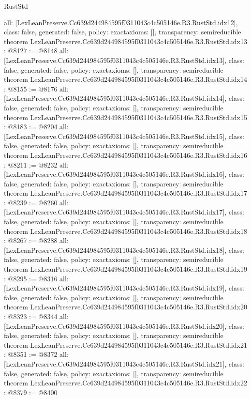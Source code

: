 \begin{lexlean}{RustStd}
\begin{coremodule}
{  all: [LexLeanPreserve.Cc639d244984595f0311043c4c505146e.R3.RustStd.idx12],
  class: false,
  generated: false,
  policy: exact{axioms: []},
  transparency: semireducible
}
theorem LexLeanPreserve.Cc639d244984595f0311043c4c505146e.R3.RustStd.idx13 : @8127 := @8148 {
  all: [LexLeanPreserve.Cc639d244984595f0311043c4c505146e.R3.RustStd.idx13],
  class: false,
  generated: false,
  policy: exact{axioms: []},
  transparency: semireducible
}
theorem LexLeanPreserve.Cc639d244984595f0311043c4c505146e.R3.RustStd.idx14 : @8155 := @8176 {
  all: [LexLeanPreserve.Cc639d244984595f0311043c4c505146e.R3.RustStd.idx14],
  class: false,
  generated: false,
  policy: exact{axioms: []},
  transparency: semireducible
}
theorem LexLeanPreserve.Cc639d244984595f0311043c4c505146e.R3.RustStd.idx15 : @8183 := @8204 {
  all: [LexLeanPreserve.Cc639d244984595f0311043c4c505146e.R3.RustStd.idx15],
  class: false,
  generated: false,
  policy: exact{axioms: []},
  transparency: semireducible
}
theorem LexLeanPreserve.Cc639d244984595f0311043c4c505146e.R3.RustStd.idx16 : @8211 := @8232 {
  all: [LexLeanPreserve.Cc639d244984595f0311043c4c505146e.R3.RustStd.idx16],
  class: false,
  generated: false,
  policy: exact{axioms: []},
  transparency: semireducible
}
theorem LexLeanPreserve.Cc639d244984595f0311043c4c505146e.R3.RustStd.idx17 : @8239 := @8260 {
  all: [LexLeanPreserve.Cc639d244984595f0311043c4c505146e.R3.RustStd.idx17],
  class: false,
  generated: false,
  policy: exact{axioms: []},
  transparency: semireducible
}
theorem LexLeanPreserve.Cc639d244984595f0311043c4c505146e.R3.RustStd.idx18 : @8267 := @8288 {
  all: [LexLeanPreserve.Cc639d244984595f0311043c4c505146e.R3.RustStd.idx18],
  class: false,
  generated: false,
  policy: exact{axioms: []},
  transparency: semireducible
}
theorem LexLeanPreserve.Cc639d244984595f0311043c4c505146e.R3.RustStd.idx19 : @8295 := @8316 {
  all: [LexLeanPreserve.Cc639d244984595f0311043c4c505146e.R3.RustStd.idx19],
  class: false,
  generated: false,
  policy: exact{axioms: []},
  transparency: semireducible
}
theorem LexLeanPreserve.Cc639d244984595f0311043c4c505146e.R3.RustStd.idx20 : @8323 := @8344 {
  all: [LexLeanPreserve.Cc639d244984595f0311043c4c505146e.R3.RustStd.idx20],
  class: false,
  generated: false,
  policy: exact{axioms: []},
  transparency: semireducible
}
theorem LexLeanPreserve.Cc639d244984595f0311043c4c505146e.R3.RustStd.idx21 : @8351 := @8372 {
  all: [LexLeanPreserve.Cc639d244984595f0311043c4c505146e.R3.RustStd.idx21],
  class: false,
  generated: false,
  policy: exact{axioms: []},
  transparency: semireducible
}
theorem LexLeanPreserve.Cc639d244984595f0311043c4c505146e.R3.RustStd.idx22 : @8379 := @8400 {
}
\end{coremodule}
\end{lexlean}
